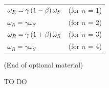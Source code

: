 \begin{table}[H]
  \centering
  \begin{tabular}{lc}
    $\omega_R = \gamma \left(1-\beta\right) \omega_S$ & (for $n$ = 1) \\[8pt]
    $\omega_R = \gamma \omega_S$ & (for $n$ = 2) \\[8pt]
    $\omega_R = \gamma \left(1+\beta\right) \omega_S$ & (for $n$ = 3) \\[8pt]
    $\omega_R = \gamma \omega_S$ & (for $n$ = 4) \\[8pt]
  \end{tabular}
\end{table}
(End of optional material)
\begin{exercise}{TO DO}

\end{exercise}
